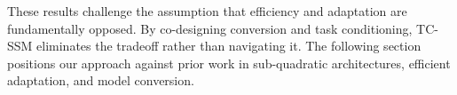 These results challenge the assumption that efficiency and adaptation are fundamentally opposed. By co-designing conversion and task conditioning, TC-SSM eliminates the tradeoff rather than navigating it. The following section positions our approach against prior work in sub-quadratic architectures, efficient adaptation, and model conversion.
